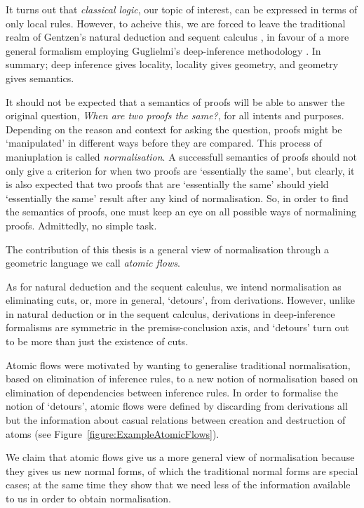 It turns out that \emph{classical logic}, our topic of interest, can be expressed in terms of only local rules. However, to acheive this, we are forced \cite{Brun:03:Two-Rest:mn} to leave the traditional realm of Gentzen's natural deduction and sequent calculus \cite{Gent:69:Investig:xi}, in favour of a more general formalism employing Guglielmi's deep-inference methodology \cite{Gugl:06:A-System:kl}. In summary; deep inference gives locality, locality gives geometry, and geometry gives semantics.

It should not be expected that a semantics of proofs will be able to answer the original question, \emph{When are two proofs the same?}, for all intents and purposes. Depending on the reason and context for asking the question, proofs might be `manipulated' in different ways before they are compared. This process of maniuplation is called \emph{normalisation}. A successfull semantics of proofs should not only give a criterion for when two proofs are `essentially the same', but clearly, it is also expected that two proofs that are `essentially the same' should yield `essentially the same' result after any kind of normalisation. So, in order to find the semantics of proofs, one must keep an eye on all possible ways of normalining proofs. Admittedly, no simple task.

The contribution of this thesis is a general view of normalisation through a geometric language we call \emph{atomic flows}.

As for natural deduction and the sequent calculus, we intend normalisation as eliminating cuts, or, more in general, `detours', from derivations. However, unlike in natural deduction or in the sequent calculus, derivations in deep-inference formalisms are symmetric in the premiss-conclusion axis, and `detours' turn out to be more than just the existence of cuts.

Atomic flows were motivated by wanting to generalise traditional normalisation, based on elimination of inference rules, to a new notion of normalisation based on elimination of dependencies between inference rules. In order to formalise the notion of `detours', atomic flows were defined by discarding from derivations all but the information about casual relations between creation and destruction of atoms (see Figure~\vref{figure:ExampleAtomicFlows}).

We claim that atomic flows give us a more general view of normalisation because they gives us new normal forms, of which the traditional normal forms are special cases; at the same time they show that we need less of the information available to us in order to obtain normalisation.

